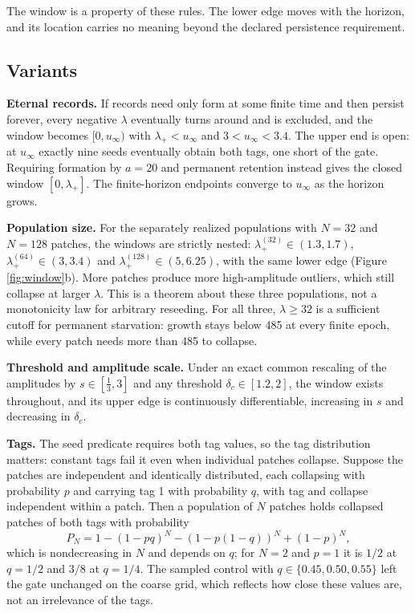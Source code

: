 The window is a property of these rules. The lower edge moves with the
horizon, and its location carries no meaning beyond the declared
persistence requirement.

\hypertarget{variants}{%
\subsection{Variants}\label{variants}}

\textbf{Eternal records.} If records need only form at some finite time
and then persist forever, every negative \(\lambda\) eventually turns
around and is excluded, and the window becomes \([0,u_\infty)\) with
\(\lambda_+<u_\infty\) and \(3<u_\infty<3.4\). The upper end is open: at
\(u_\infty\) exactly nine seeds eventually obtain both tags, one short
of the gate. Requiring formation by \(a=20\) and permanent retention
instead gives the closed window \([0,\lambda_+]\). The finite-horizon
endpoints converge to \(u_\infty\) as the horizon grows.

\textbf{Population size.} For the separately realized populations with
\(N=32\) and \(N=128\) patches, the windows are strictly nested:
\(\lambda_+^{(32)}\in(1.3,1.7)\), \(\lambda_+^{(64)}\in(3,3.4)\) and
\(\lambda_+^{(128)}\in(5,6.25)\), with the same lower edge (Figure
\ref{fig:window}b). More patches produce more high-amplitude outliers,
which still collapse at larger \(\lambda\). This is a theorem about
these three populations, not a monotonicity law for arbitrary reseeding.
For all three, \(\lambda\ge32\) is a sufficient cutoff for permanent
starvation: growth stays below 485 at every finite epoch, while every
patch needs more than 485 to collapse.

\textbf{Threshold and amplitude scale.} Under an exact common rescaling
of the amplitudes by \(s\in[\tfrac13,3]\) and any threshold
\(\delta_c\in[1.2,2]\), the window exists throughout, and its upper edge
is continuously differentiable, increasing in \(s\) and decreasing in
\(\delta_c\).

\textbf{Tags.} The seed predicate requires both tag values, so the tag
distribution matters: constant tags fail it even when individual patches
collapse. Suppose the patches are independent and identically
distributed, each collapsing with probability \(p\) and carrying tag 1
with probability \(q\), with tag and collapse independent within a
patch. Then a population of \(N\) patches holds collapsed patches of
both tags with probability \[P_N=1-(1-pq)^N-(1-p(1-q))^N+(1-p)^N ,\]
which is nondecreasing in \(N\) and depends on \(q\); for \(N=2\) and
\(p=1\) it is \(1/2\) at \(q=1/2\) and \(3/8\) at \(q=1/4\). The sampled
control with \(q\in\{0.45,0.50,0.55\}\) left the gate unchanged on the
coarse grid, which reflects how close these values are, not an
irrelevance of the tags.

